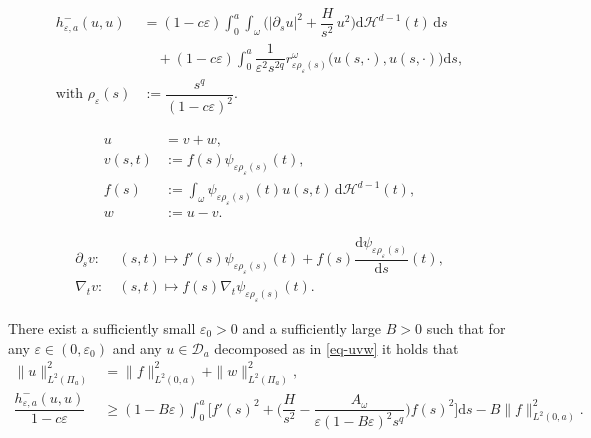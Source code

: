 \documentclass[10pt,a4paper]{amsart}
\newcommand{\cD}{\mathcal{D}}
\newcommand{\dd}{\mathrm{d}}
\newcommand{\eps}{\varepsilon}
\renewcommand{\H}{\mathcal{H}}
\begin{document}
\begin{equation}
	\label{hplus1b}	
	\begin{aligned}
		h^{-}_{\eps,a}(u,u)&= (1-c\eps)\int_0^a \int_{\omega}\bigg(|\partial_su|^2+\dfrac{H}{s^2}\,u^2\bigg)\dd\H^{d-1}(t)\,\dd s\\
		&\quad
		+(1-c\eps)\int_0^a \dfrac{1}{\eps^2s^{2q}} r^\omega_{\eps\rho_\eps(s)}\big(u(s,\cdot),u(s,\cdot)\big)\dd s,\\
\text{with }	\rho_\eps(s)&:=\dfrac{s^q}{(1-c\eps)^2}.
	\end{aligned}
\end{equation}

\begin{align}
	u&=v+w, \label{eq-uvw}\\
	v(s,t)&:=f(s)\psi_{\eps\rho_\eps(s)}(t),\nonumber\\
	f(s)&:=\int_\omega \psi_{\eps\rho_\eps(s)}(t)u(s,t)\,\dd\H^{d-1}(t),\nonumber\\
w&:=u-v. \nonumber
\end{align}

\begin{align}
	\partial_s v:&\ (s,t)\mapsto f'(s)\psi_{\eps \rho_\eps(s)}(t)+f(s)\dfrac{\dd \psi_{\eps\rho_\eps(s)}}{\dd s}(t), \label{psv}\\
	\nabla_t v:&\ (s,t)\mapsto f(s)\nabla_t \psi_{\eps \rho_\eps(s)}(t).\nonumber
\end{align}

\begin{lemma}\label{lem43}
There exist a sufficiently small $\eps_0>0$ and a sufficiently large $B>0$ such that
for any $\eps\in(0,\eps_0)$ and any $u\in \cD_a$ decomposed as in \eqref{eq-uvw} it holds that
\begin{align*}
\|u\|^2_{L^2(\Pi_a)}&=\|f\|^2_{L^2(0,a)}+\|w\|^2_{L^2(\Pi_a)},\\
\dfrac{h^-_{\eps,a}(u,u)}{1-c\eps}&\ge (1-B\eps)\int_0^a\bigg[f'(s)^2  +\bigg(\dfrac{H}{s^2}
-\dfrac{A_\omega}{\eps (1-B\eps)^2 s^q}\bigg)	f(s)^2	\bigg]\dd s
-B\|f\|^2_{L^2(0,a)}.
\end{align*}
\end{lemma}
\end{document}
